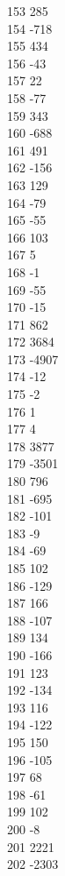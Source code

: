{ 153	285 \\
 154	-718 \\
 155	434 \\
 156	-43 \\
 157	22 \\
 158	-77 \\
 159	343 \\
 160	-688 \\
 161	491 \\
 162	-156 \\
 163	129 \\
 164	-79 \\
 165	-55 \\
 166	103 \\
 167	5 \\
 168	-1 \\
 169	-55 \\
 170	-15 \\
 171	862 \\
 172	3684 \\
 173	-4907 \\
 174	-12 \\
 175	-2 \\
 176	1 \\
 177	4 \\
 178	3877 \\
 179	-3501 \\
 180	796 \\
 181	-695 \\
 182	-101 \\
 183	-9 \\
 184	-69 \\
 185	102 \\
 186	-129 \\
 187	166 \\
 188	-107 \\
 189	134 \\
 190	-166 \\
 191	123 \\
 192	-134 \\
 193	116 \\
 194	-122 \\
 195	150 \\
 196	-105 \\
 197	68 \\
 198	-61 \\
 199	102 \\
 200	-8 \\
 201	2221 \\
 202	-2303 \\
}
